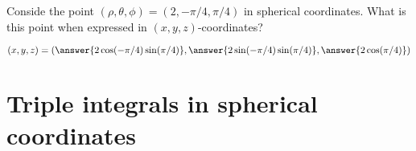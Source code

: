 \documentclass{ximera}
\begin{document}
\begin{question}
  Conside the point $(\rho,\theta,\phi)=(2,-\pi/4,\pi/4)$ in spherical coordinates. What is
  this point when expressed in $(x,y,z)$-coordinates?
  \begin{prompt}
    \[
    (x,y,z) = (\answer{2\cos(-\pi/4)\sin(\pi/4)}, \answer{2 \sin(-\pi/4)\sin(\pi/4)},\answer{2\cos(\pi/4)})
    \]
  \end{prompt}
\end{question}

\section{Triple integrals in spherical coordinates}
\end{document}
